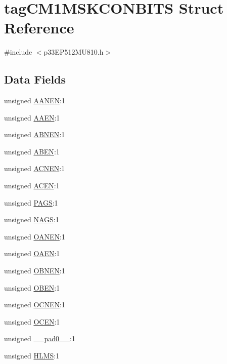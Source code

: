 \hypertarget{structtag_c_m1_m_s_k_c_o_n_b_i_t_s}{}\section{tag\+C\+M1\+M\+S\+K\+C\+O\+N\+B\+I\+TS Struct Reference}
\label{structtag_c_m1_m_s_k_c_o_n_b_i_t_s}


{\ttfamily \#include $<$p33\+E\+P512\+M\+U810.\+h$>$}

\subsection*{Data Fields}
\begin{DoxyCompactItemize}
\item 
unsigned \hyperlink{structtag_c_m1_m_s_k_c_o_n_b_i_t_s_a6ea89b9cbdf0bbde3ec8147513e70fa0}{A\+A\+N\+EN}\+:1
\item 
unsigned \hyperlink{structtag_c_m1_m_s_k_c_o_n_b_i_t_s_a58bba29325ff11212a73bae4b2b1a707}{A\+A\+EN}\+:1
\item 
unsigned \hyperlink{structtag_c_m1_m_s_k_c_o_n_b_i_t_s_a1b2c756ac7255e490499f85cb2d746f3}{A\+B\+N\+EN}\+:1
\item 
unsigned \hyperlink{structtag_c_m1_m_s_k_c_o_n_b_i_t_s_abae9997777bf70f8cf9132c18db1e83d}{A\+B\+EN}\+:1
\item 
unsigned \hyperlink{structtag_c_m1_m_s_k_c_o_n_b_i_t_s_af825e9ea0f6690d86c6ca9bda2e82eb1}{A\+C\+N\+EN}\+:1
\item 
unsigned \hyperlink{structtag_c_m1_m_s_k_c_o_n_b_i_t_s_a24d602e77c5a5ec039de0ff29062d01b}{A\+C\+EN}\+:1
\item 
unsigned \hyperlink{structtag_c_m1_m_s_k_c_o_n_b_i_t_s_af5feed07d2e415c635200336f0f05e41}{P\+A\+GS}\+:1
\item 
unsigned \hyperlink{structtag_c_m1_m_s_k_c_o_n_b_i_t_s_ac2ecf95cef4a90da8a3ad0a239927fd2}{N\+A\+GS}\+:1
\item 
unsigned \hyperlink{structtag_c_m1_m_s_k_c_o_n_b_i_t_s_a8b7682af91333014cf4ab125c6a6fe8d}{O\+A\+N\+EN}\+:1
\item 
unsigned \hyperlink{structtag_c_m1_m_s_k_c_o_n_b_i_t_s_a899903902775809e354711c79071013b}{O\+A\+EN}\+:1
\item 
unsigned \hyperlink{structtag_c_m1_m_s_k_c_o_n_b_i_t_s_afa6d54b4c9f6bf6feb885f00044987b2}{O\+B\+N\+EN}\+:1
\item 
unsigned \hyperlink{structtag_c_m1_m_s_k_c_o_n_b_i_t_s_a69019780861408d14c164f55a9995819}{O\+B\+EN}\+:1
\item 
unsigned \hyperlink{structtag_c_m1_m_s_k_c_o_n_b_i_t_s_a8bee27f84106873154bb0f1b9d244ebd}{O\+C\+N\+EN}\+:1
\item 
unsigned \hyperlink{structtag_c_m1_m_s_k_c_o_n_b_i_t_s_ad7c118cfef34dec7ba06f5968b47200c}{O\+C\+EN}\+:1
\item 
unsigned \hyperlink{structtag_c_m1_m_s_k_c_o_n_b_i_t_s_adf71f3d8410c1f1dbbc96680a92c49af}{\+\_\+\+\_\+pad0\+\_\+\+\_\+}\+:1
\item 
unsigned \hyperlink{structtag_c_m1_m_s_k_c_o_n_b_i_t_s_ae12e5557e1ca033e11465acebb086d49}{H\+L\+MS}\+:1
\end{DoxyCompactItemize}


